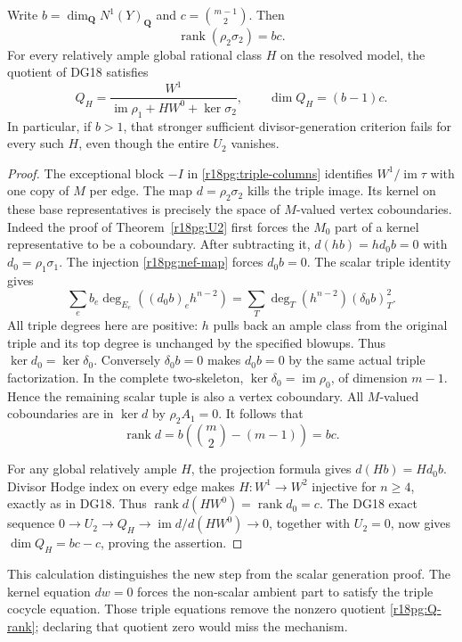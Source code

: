 \begin{proposition}
\label{r18pg:Q-dimension}
Write $b=\dim_{\mathbf Q}N^1(Y)_{\mathbf Q}$ and
$c=\binom{m-1}{2}$.  Then
\[
                      \operatorname{rank}(\rho_2\sigma_2)=bc.
 \tag{PG18.23}\label{r18pg:d-rank}
\]
For every relatively ample global rational class $H$ on the
resolved model, the quotient of DG18 satisfies
\[
 Q_H=\frac{W^1}{\operatorname{im}\rho_1+HW^0+\ker\sigma_2},
              \qquad \dim Q_H=(b-1)c.
 \tag{PG18.24}\label{r18pg:Q-rank}
\]
In particular, if $b>1$, that stronger sufficient
divisor-generation criterion fails for every such $H$, even
though the entire $U_2$ vanishes.
\end{proposition}

\begin{proof}
The exceptional block $-I$ in \eqref{r18pg:triple-columns}
identifies $W^1/\operatorname{im}\tau$ with one copy of $M$
per edge.  The map $d=\rho_2\sigma_2$ kills the triple image.
Its kernel on these base representatives is precisely the
space of $M$-valued vertex coboundaries.
Indeed the proof of Theorem~\ref{r18pg:U2} first forces the
$M_0$ part of a kernel representative to be a coboundary.
After subtracting it, $d(hb)=h d_0b=0$ with
$d_0=\rho_1\sigma_1$.  The injection
\eqref{r18pg:nef-map} forces $d_0b=0$.
The scalar triple identity gives
\[
 \sum_e b_e\deg_{E_e}((d_0b)_eh^{n-2})
           =\sum_T\deg_T(h^{n-2})(\delta_0b)_T^2.
\]
All triple degrees here are positive: $h$ pulls back an ample
class from the original triple and its top degree is unchanged
by the specified blowups.  Thus $\ker d_0=\ker\delta_0$.
Conversely $\delta_0b=0$ makes $d_0b=0$ by the same actual
triple factorization.  In the complete two-skeleton,
$\ker\delta_0=\operatorname{im}\rho_0$, of dimension $m-1$.
Hence the remaining scalar tuple is also a vertex coboundary.
All $M$-valued coboundaries are in $\ker d$ by
$\rho_2A_1=0$.  It follows that
\[
 \operatorname{rank}d
       =b\left(\binom m2-(m-1)\right)=bc.
\]

For any global relatively ample $H$, the projection formula
gives $d(Hb)=H d_0b$.  Divisor Hodge index on every edge
makes $H:W^1\to W^2$ injective for $n\ge4$, exactly as in
DG18.  Thus $\operatorname{rank}d(HW^0)=\operatorname{rank}d_0=c$.
The DG18 exact sequence
$0\to U_2\to Q_H\to\operatorname{im}d/d(HW^0)\to0$,
together with $U_2=0$, now gives
$\dim Q_H=bc-c$, proving the assertion.
\end{proof}

This calculation distinguishes the new step from the scalar
generation proof.  The kernel equation $dw=0$ forces the
non-scalar ambient part to satisfy the triple cocycle equation.
Those triple equations remove the nonzero quotient
\eqref{r18pg:Q-rank}; declaring that quotient zero would miss
the mechanism.


